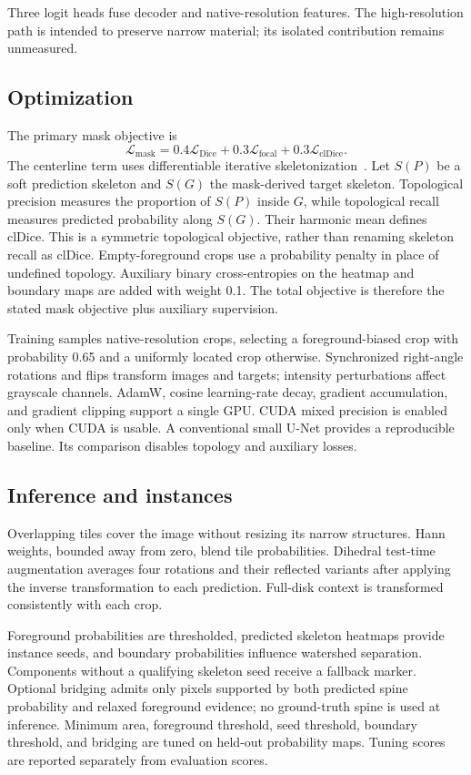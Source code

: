 \documentclass[conference]{IEEEtran}
\begin{document}
Three logit heads fuse decoder and native-resolution features. The high-resolution path is intended to preserve narrow material; its isolated contribution remains unmeasured.

\subsection{Optimization}
The primary mask objective is
\begin{equation}
\mathcal L_{\mathrm{mask}}=0.4\mathcal L_{\mathrm{Dice}}+
0.3\mathcal L_{\mathrm{focal}}+0.3\mathcal L_{\mathrm{clDice}}.
\end{equation}
The centerline term uses differentiable iterative skeletonization~\cite{cldice}. Let $S(P)$ be a soft prediction skeleton and $S(G)$ the mask-derived target skeleton. Topological precision measures the proportion of $S(P)$ inside $G$, while topological recall measures predicted probability along $S(G)$. Their harmonic mean defines clDice. This is a symmetric topological objective, rather than renaming skeleton recall as clDice. Empty-foreground crops use a probability penalty in place of undefined topology. Auxiliary binary cross-entropies on the heatmap and boundary maps are added with weight 0.1. The total objective is therefore the stated mask objective plus auxiliary supervision.

Training samples native-resolution crops, selecting a foreground-biased crop with probability 0.65 and a uniformly located crop otherwise. Synchronized right-angle rotations and flips transform images and targets; intensity perturbations affect grayscale channels. AdamW, cosine learning-rate decay, gradient accumulation, and gradient clipping support a single GPU. CUDA mixed precision is enabled only when CUDA is usable. A conventional small U-Net provides a reproducible baseline. Its comparison disables topology and auxiliary losses.

\subsection{Inference and instances}
Overlapping tiles cover the image without resizing its narrow structures. Hann weights, bounded away from zero, blend tile probabilities. Dihedral test-time augmentation averages four rotations and their reflected variants after applying the inverse transformation to each prediction. Full-disk context is transformed consistently with each crop.

Foreground probabilities are thresholded, predicted skeleton heatmaps provide instance seeds, and boundary probabilities influence watershed separation. Components without a qualifying skeleton seed receive a fallback marker. Optional bridging admits only pixels supported by both predicted spine probability and relaxed foreground evidence; no ground-truth spine is used at inference. Minimum area, foreground threshold, seed threshold, boundary threshold, and bridging are tuned on held-out probability maps. Tuning scores are reported separately from evaluation scores.
\end{document}
